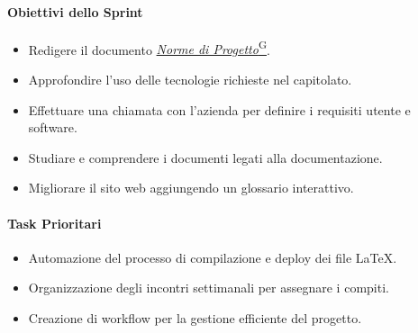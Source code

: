 \documentclass{article}
\begin{document}
                \paragraph{Obiettivi dello Sprint}
                    \begin{itemize}
                        \item Redigere il documento \href{https://code7crusaders.github.io/docs/RTB/documentazione_interna/glossario.html#norme-di-progetto}{\emph{Norme di Progetto}\textsuperscript{G}}.
                        \item Approfondire l'uso delle tecnologie richieste nel capitolato.
                        \item Effettuare una chiamata con l'azienda per definire i requisiti utente e software.
                        \item Studiare e comprendere i documenti legati alla documentazione.
                        \item Migliorare il sito web aggiungendo un glossario interattivo.
                    \end{itemize}

                \paragraph{Task Prioritari}
                    \begin{itemize}
                        \item Automazione del processo di compilazione e deploy dei file LaTeX.
                        \item Organizzazione degli incontri settimanali per assegnare i compiti.
                        \item Creazione di workflow per la gestione efficiente del progetto.
                    \end{itemize}

\end{document}
